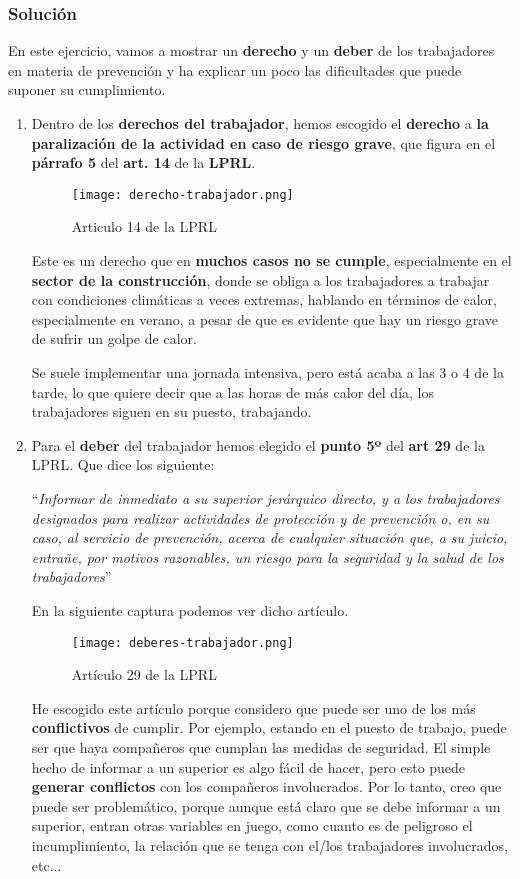 \subsubsection{Solución}
En este ejercicio, vamos a mostrar un \textbf{derecho} y un \textbf{deber} de los trabajadores en materia de prevención y ha explicar un poco las dificultades que puede suponer su cumplimiento.
\begin{enumerate}[label=\alph*.]
    \item Dentro de los \textbf{derechos del trabajador}, hemos escogido el \textbf{derecho} a \textbf{la paralización de la actividad en caso de riesgo grave}, que figura en el \textbf{párrafo 5} del \textbf{art. 14} de la \textbf{LPRL}.

    \begin{figure}[H]
        \centering
        \texttt{[image: derecho-trabajador.png]}
        \caption{Articulo 14 de la LPRL}
    \end{figure}

    Este es un derecho que en \textbf{muchos casos no se cumple}, especialmente en el \textbf{sector de la construcción}, donde se obliga a los trabajadores a trabajar con condiciones climáticas a veces extremas, hablando en términos de calor, especialmente en verano, a pesar de que es evidente que hay un riesgo grave de sufrir un golpe de calor.

    Se suele implementar una jornada intensiva, pero está acaba a las 3 o 4 de la tarde, lo que quiere decir que a las horas de más calor del día, los trabajadores siguen en su puesto, trabajando.


    \item Para el \textbf{deber} del trabajador hemos elegido el \textbf{punto 5º} del \textbf{art 29} de la LPRL. Que dice los siguiente:

    ``\textit{Informar de inmediato a su superior jerárquico directo, y a los trabajadores designados para realizar actividades de protección y de prevención o, en su caso, al servicio de prevención, acerca de cualquier situación que, a su juicio, entrañe, por motivos razonables, un riesgo para la seguridad y la salud de los trabajadores}''

    En la siguiente captura podemos ver dicho artículo.

    \begin{figure}[H]
        \centering
        \texttt{[image: deberes-trabajador.png]}
        \caption{Artículo 29 de la LPRL}
    \end{figure}

    He escogido este artículo porque considero que puede ser uno de los más \textbf{conflictivos} de cumplir. Por ejemplo, estando en el puesto de trabajo, puede ser que haya compañeros que cumplan las medidas de seguridad. El simple hecho de informar a un superior es algo fácil de hacer, pero esto puede \textbf{generar conflictos} con los compañeros involucrados. Por lo tanto, creo que puede ser problemático, porque aunque está claro que se debe informar a un superior, entran otras variables en juego, como cuanto es de peligroso el incumplimiento, la relación que se tenga con el/los trabajadores involucrados, etc...
\end{enumerate}

